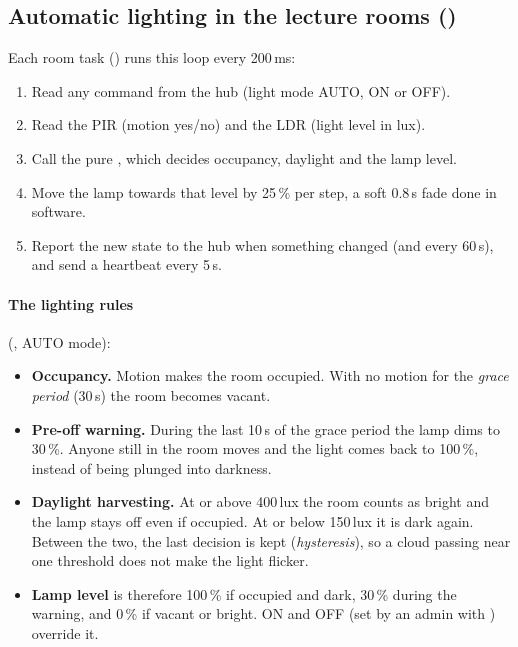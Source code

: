 
\subsection{Automatic lighting in the lecture rooms ()}
\label{sec:op-lighting}
Each room task () runs this loop every 200\,ms:
\begin{enumerate}
  \item Read any command from the hub (light mode AUTO, ON or OFF).
  \item Read the PIR (motion yes/no) and the LDR (light level in lux).
  \item Call the pure , which decides occupancy, daylight and the lamp
        level.
  \item Move the lamp towards that level by 25\,\% per step, a soft 0.8\,s fade done in software.
  \item Report the new state to the hub when something changed (and every 60\,s), and send a
        heartbeat every 5\,s.
\end{enumerate}

\paragraph{The lighting rules} (, AUTO mode):
\begin{itemize}
  \item \textbf{Occupancy.} Motion makes the room occupied. With no motion for the \emph{grace
        period} (30\,s) the room becomes vacant.
  \item \textbf{Pre-off warning.} During the last 10\,s of the grace period the lamp dims to
        30\,\%. Anyone still in the room moves and the light comes back to 100\,\%, instead of
        being plunged into darkness.
  \item \textbf{Daylight harvesting.} At or above 400\,lux the room counts as bright and the lamp
        stays off even if occupied. At or below 150\,lux it is dark again. Between the two, the
        last decision is kept (\emph{hysteresis}), so a cloud passing near one threshold does not
        make the light flicker.
  \item \textbf{Lamp level} is therefore 100\,\% if occupied and dark, 30\,\% during the warning,
        and 0\,\% if vacant or bright. ON and OFF (set by an admin with ) override it.
\end{itemize}

